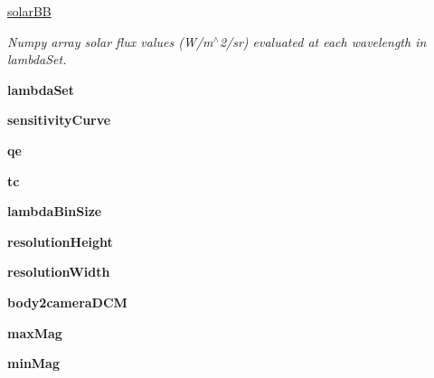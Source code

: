\begin{DoxyCompactItemize}
\hyperlink{classcamera_1_1camera_ab98b2a4012762c8cb79033b97abcae77}{solar\+BB}
\begin{DoxyCompactList}\small\item\em Numpy array solar flux values (W/m$^\wedge$2/sr) evaluated at each wavelength in lambda\+Set. \end{DoxyCompactList}\item 
\mbox{\label{classcamera_1_1camera_ab894e50c809164311213c47008b1ea4b}} 
{\bfseries lambda\+Set}
\item 
\mbox{\label{classcamera_1_1camera_a00e6953eb53479aab5465d262918e3c3}} 
{\bfseries sensitivity\+Curve}
\item 
\mbox{\label{classcamera_1_1camera_a3ebdd1a5df3595720f29ee9213c6008c}} 
{\bfseries qe}
\item 
\mbox{\label{classcamera_1_1camera_ae852aaa1a3d02cf4cdb52235efc3a1aa}} 
{\bfseries tc}
\item 
\mbox{\label{classcamera_1_1camera_afca677188148d6517b2f6eb63cee1b00}} 
{\bfseries lambda\+Bin\+Size}
\item 
\mbox{\label{classcamera_1_1camera_a21c903dc4b9dc968d31ac6a30e223854}} 
{\bfseries resolution\+Height}
\item 
\mbox{\label{classcamera_1_1camera_a0c4fc89c6a380cbf95304974ff694fa5}} 
{\bfseries resolution\+Width}
\item 
\mbox{\label{classcamera_1_1camera_a0673f6da3f62fcffe90b5b006c210676}} 
{\bfseries body2camera\+D\+CM}
\item 
\mbox{\label{classcamera_1_1camera_a0396d22ae352c1c8e851ed69aa69d2de}} 
{\bfseries max\+Mag}
\item 
\mbox{\label{classcamera_1_1camera_a8717d2f182ba4868f2e58ec7a4833865}} 
{\bfseries min\+Mag}
\item 
\mbox{\label{classcamera_1_1camera_abb3447aee1f7d4ecf5a6650cf0c13200}} 

\end{DoxyCompactItemize}
